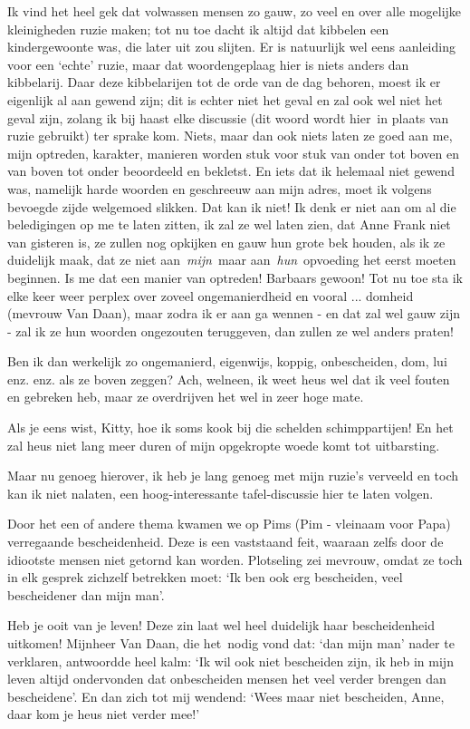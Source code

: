 \documentclass{book}
\begin{document}
Ik vind het heel gek dat volwassen mensen zo gauw, zo veel en over alle
mogelijke kleinigheden ruzie maken; tot nu toe dacht ik altijd dat kibbelen een
kindergewoonte was, die later uit zou slijten. Er is natuurlijk wel eens
aanleiding voor een `echte' ruzie, maar dat woordengeplaag hier is niets anders
dan kibbelarij. Daar deze kibbelarijen tot de orde van de dag behoren, moest ik
er eigenlijk al aan gewend zijn; dit is echter niet het geval en zal ook wel
niet het geval zijn, zolang ik bij haast elke discussie (dit woord wordt hier~in
plaats van ruzie gebruikt) ter sprake kom. Niets, maar dan ook niets laten ze
goed aan me, mijn optreden, karakter, manieren worden stuk voor stuk van onder
tot boven en van boven tot onder beoordeeld en bekletst.  En iets dat ik
helemaal niet gewend was, namelijk harde woorden en geschreeuw aan mijn adres,
moet ik volgens bevoegde zijde welgemoed slikken. Dat kan ik niet! Ik denk er
niet aan om al die beledigingen op me te laten zitten, ik zal ze wel laten zien,
dat Anne Frank niet van gisteren is, ze zullen nog opkijken en gauw hun grote
bek houden, als ik ze duidelijk maak, dat ze niet aan~\emph{mijn}~maar
aan~\emph{hun}~opvoeding het eerst moeten beginnen. Is me dat een manier van
optreden! Barbaars gewoon! Tot nu toe sta ik elke keer weer perplex over zoveel
ongemanierdheid en vooral ... domheid (mevrouw Van Daan), maar zodra ik er aan
ga wennen - en dat zal wel gauw zijn - zal ik ze hun woorden ongezouten
teruggeven, dan zullen ze wel anders praten!

Ben ik dan werkelijk zo ongemanierd, eigenwijs, koppig, onbescheiden, dom, lui
enz. enz. als ze boven zeggen? Ach, welneen, ik weet heus wel dat ik veel fouten
en gebreken heb, maar ze overdrijven het wel in zeer hoge mate.

Als je eens wist, Kitty, hoe ik soms kook bij die schelden schimppartijen! En
het zal heus niet lang meer duren of mijn opgekropte woede komt tot uitbarsting.

Maar nu genoeg hierover, ik heb je lang genoeg met mijn ruzie's verveeld en toch
kan ik niet nalaten, een hoog-interessante tafel-discussie hier te laten volgen.

Door het een of andere thema kwamen we op Pims (Pim - vleinaam voor Papa)
verregaande bescheidenheid. Deze is een vaststaand feit, waaraan zelfs door de
idiootste mensen niet getornd kan worden. Plotseling zei mevrouw, omdat ze toch
in elk gesprek zichzelf betrekken moet: `Ik ben ook erg bescheiden, veel
bescheidener dan mijn man'.

Heb je ooit van je leven! Deze zin laat wel heel duidelijk haar bescheidenheid
uitkomen! Mijnheer Van Daan, die het~nodig vond dat: `dan mijn man' nader te
verklaren, antwoordde heel kalm: `Ik wil ook niet bescheiden zijn, ik heb in
mijn leven altijd ondervonden dat onbescheiden mensen het veel verder brengen
dan bescheidene'. En dan zich tot mij wendend: `Wees maar niet bescheiden, Anne,
daar kom je heus niet verder mee!'
\end{document}
